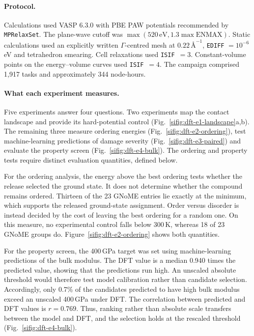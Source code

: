 \paragraph{Protocol.} Calculations used VASP 6.3.0 with PBE PAW potentials recommended by
\texttt{MPRelaxSet}. The plane-wave cutoff was
$\max(520\,\mathrm{eV}, 1.3\max\mathrm{ENMAX})$. Static calculations used an explicitly
written $\Gamma$-centred mesh at $0.22\,\text{\AA}^{-1}$, \texttt{EDIFF}
$=10^{-6}$\,eV and tetrahedron smearing. Cell relaxations used \texttt{ISIF}~$=3$.
Constant-volume points on the energy--volume curves used \texttt{ISIF}~$=4$. The campaign
comprised 1{,}917 tasks and approximately 344 node-hours.

\paragraph{What each experiment measures.} Five experiments answer four questions. Two
experiments map the contact landscape and provide its hard-potential control
(Fig.~\ref{sifig:dft-e1-landscape}a,b). The remaining three measure ordering energies
(Fig.~\ref{sifig:dft-e2-ordering}), test machine-learning predictions of damage severity
(Fig.~\ref{sifig:dft-e3-paired}) and evaluate the property screen
(Fig.~\ref{sifig:dft-e4-bulk}). The ordering and property tests require distinct evaluation
quantities, defined below.

For the ordering analysis, the energy above the best ordering tests whether the release
selected the ground state. It does not determine whether the compound remains ordered.
Thirteen of the 23 GNoME entries lie exactly at the minimum, which supports the released
ground-state assignment. Order versus disorder is instead decided by the cost of leaving
the best ordering for a random one. On this measure, no experimental control falls below
300\,K, whereas 18 of 23 GNoME groups do. Figure~\ref{sifig:dft-e2-ordering} shows both
quantities.

For the property screen, the 400\,GPa target was set using machine-learning predictions of
the bulk modulus. The DFT value is a median 0.940 times the predicted value, showing that
the predictions run high. An unscaled absolute threshold would therefore test model
calibration rather than candidate selection. Accordingly, only 0.7\% of the candidates
predicted to have high bulk modulus exceed an unscaled 400\,GPa under DFT. The correlation
between predicted and DFT values is $r=0.769$. Thus, ranking rather than absolute scale
transfers between the model and DFT, and the selection holds at the rescaled threshold
(Fig.~\ref{sifig:dft-e4-bulk}).

